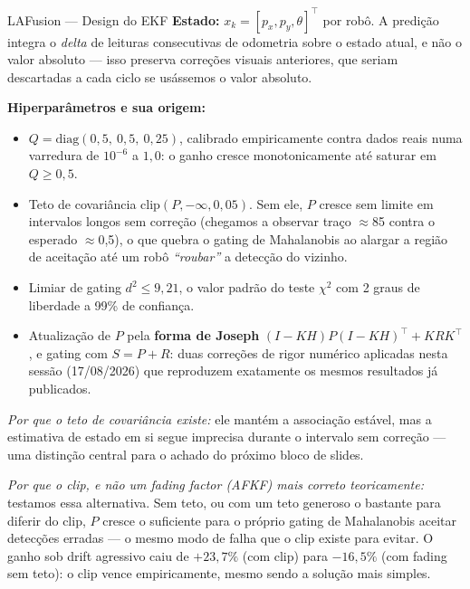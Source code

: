 \documentclass[aspectratio=169]{beamer}
\begin{document}
\begin{frame}{LAFusion — Design do EKF}
\textbf{Estado:} $x_k = [p_x, p_y, \theta]^\top$ por robô. A predição integra o \emph{delta} de leituras consecutivas de odometria sobre o estado atual, e não o valor absoluto — isso preserva correções visuais anteriores, que seriam descartadas a cada ciclo se usássemos o valor absoluto.

\vspace{0.3cm}
\textbf{Hiperparâmetros e sua origem:}
\begin{itemize}
\item $Q = \text{diag}(0{,}5,\ 0{,}5,\ 0{,}25)$, calibrado empiricamente contra dados reais numa varredura de $10^{-6}$ a $1{,}0$: o ganho cresce monotonicamente até saturar em $Q\geq0{,}5$.
\item Teto de covariância $\text{clip}(P, -\infty, 0{,}05)$. Sem ele, $P$ cresce sem limite em intervalos longos sem correção (chegamos a observar traço $\approx$85 contra o esperado $\approx$0,5), o que quebra o gating de Mahalanobis ao alargar a região de aceitação até um robô \emph{``roubar''} a detecção do vizinho.
\item Limiar de gating $d^2 \leq 9{,}21$, o valor padrão do teste $\chi^2$ com 2 graus de liberdade a 99\% de confiança.
\item Atualização de $P$ pela \textbf{forma de Joseph} $(I-KH)P(I-KH)^\top + KRK^\top$, e gating com $S=P+R$: duas correções de rigor numérico aplicadas nesta sessão (17/08/2026) que reproduzem exatamente os mesmos resultados já publicados.
\end{itemize}

\vspace{0.15cm}
\scriptsize \emph{Por que o teto de covariância existe:} ele mantém a associação estável, mas a estimativa de estado em si segue imprecisa durante o intervalo sem correção — uma distinção central para o achado do próximo bloco de slides.

\vspace{0.05cm}
\scriptsize \emph{Por que o clip, e não um fading factor (AFKF) mais correto teoricamente:} testamos essa alternativa. Sem teto, ou com um teto generoso o bastante para diferir do clip, $P$ cresce o suficiente para o próprio gating de Mahalanobis aceitar detecções erradas — o mesmo modo de falha que o clip existe para evitar. O ganho sob drift agressivo caiu de $+23{,}7\%$ (com clip) para $-16{,}5\%$ (com fading sem teto): o clip vence empiricamente, mesmo sendo a solução mais simples.
\end{frame}
\end{document}

